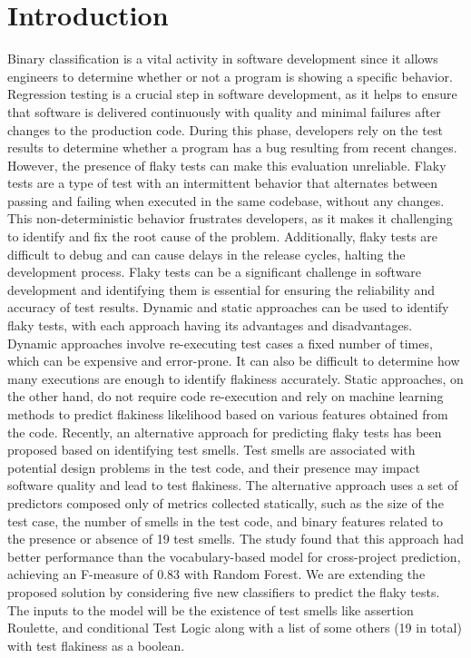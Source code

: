\documentclass[sigconf,review]{acmart}
\begin{document}
\section{Introduction}
\label{Section:Introduction}
Binary classification is a vital activity in software development since it allows engineers to determine whether or not a program is showing a specific behavior. Regression testing is a crucial step in software development, as it helps to ensure that software is delivered continuously with quality and minimal failures after changes to the production code. During this phase, developers rely on the test results to determine whether a program has a bug resulting from recent changes. However, the presence of flaky tests can make this evaluation unreliable. Flaky tests are a type of test with an intermittent behavior that alternates between passing and failing when executed in the same codebase, without any changes. This non-deterministic behavior frustrates developers, as it makes it challenging to identify and fix the root cause of the problem. Additionally, flaky tests are difficult to debug and can cause delays in the release cycles, halting the development process.
Flaky tests can be a significant challenge in software development and identifying them is essential for ensuring the reliability and accuracy of test results. Dynamic and static approaches can be used to identify flaky tests, with each approach having its advantages and disadvantages.
Dynamic approaches involve re-executing test cases a fixed number of times, which can be expensive and error-prone. It can also be difficult to determine how many executions are enough to identify flakiness accurately. Static approaches, on the other hand, do not require code re-execution and rely on machine learning methods to predict flakiness likelihood based on various features obtained from the code.
Recently, an alternative approach for predicting flaky tests has been proposed based on identifying test smells. Test smells are associated with potential design problems in the test code, and their presence may impact software quality and lead to test flakiness. The alternative approach uses a set of predictors composed only of metrics collected statically, such as the size of the test case, the number of smells in the test code, and binary features related to the presence or absence of 19 test smells. The study found that this approach had better performance than the vocabulary-based model for cross-project prediction, achieving an F-measure of 0.83 with Random Forest.
We are extending the proposed solution by considering five new classifiers to predict the flaky tests. The inputs to the model will be the existence of test smells like assertion Roulette, and conditional Test Logic along with a list of some others (19 in total) with test flakiness as a boolean.
\\
 
\end{document}
